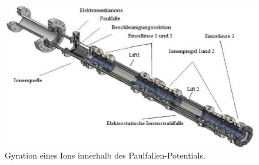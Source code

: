 \documentclass[numbers=noenddot,a4paper,notitlepage,twoside,BCOR15mm]{scrartcl}
\begin{document}
		\begin{figure}[t]
			\centering
			\includegraphics[width=\textwidth]{aufbau.png}
			\caption{Gyration eines Ions innerhalb des Paulfallen-Potentials. \cite{UMainzReflektron}}
			\label{img:aufbau}
		\end{figure}
\end{document}
